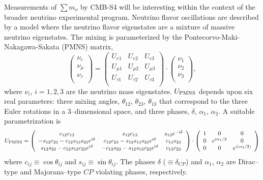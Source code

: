 Measurements of $ \sum m_\nu $ by CMB-S4 will be interesting within the context of the broader neutrino experimental program. Neutrino flavor oscillations are described by a model where the neutrino flavor eigenstates are a mixture of massive neutrino eigenstates. The mixing is parameterized by the Pontecorvo-Maki-Nakagawa-Sakata (PMNS) matrix,
\[ \left( \begin{array}{c} \nu_e \\ \nu_{\mu} \\ \nu_{\tau} \\ \end{array} \right) = 
\left( \begin{array}{ccc} U_{e1} & U_{e2} & U_{e3} \\ U_{\mu1} & U_{\mu2} & U_{\mu3} \\ U_{\tau1} & U_{\tau2} & U_{\tau3} \\
\end{array} \right) \cdot
\left( \begin{array}{c} \nu_1 \\ \nu_2 \\ \nu_3 \\ \end{array} \right),
\]
where $\nu_{i}$, $i=1,2,3$ are the neutrino mass eigenstates. $U_{\rm PMNS}$ depends upon six real parameters: three mixing angles, $\theta_{12}$,  $\theta_{23}$, $\theta_{13}$ that
correspond to the three Euler rotations in a 3--dimensional space, and three phases, $\delta$, $\alpha_1$, $\alpha_2$. A suitable parametrization is
\[ U_{\rm PMNS}=
\left( \begin{array}{ccc} c_{12}c_{13} & s_{12}c_{13} & s_{13} e^{-i\delta} \\ 
-s_{12}c_{23} - c_{12}s_{13}s_{23} e^{i\delta} & c_{12}c_{23} - s_{12}s_{13}s_{23} e^{i\delta} & c_{13}s_{23} \\
s_{12}s_{23} - c_{12}s_{13}c_{23} e^{i\delta} & -c_{12}s_{23} - s_{12}s_{13}c_{23} e^{i\delta} & c_{13}c_{23} \\
\end{array} \right) \cdot
\left( \begin{array}{ccc} 1 & 0 & 0 \\ 0 & e^{i\alpha_1/2} & 0 \\ 0 & 0 & e^{i(\alpha_2/2)} \\ 
\end{array} \right)
\]
where $c_{ij} \equiv \cos\theta_{ij}$ and $s_{ij} \equiv \sin\theta_{ij}$. 
The phases $\delta$ ($\equiv \delta_{CP}$) and $\alpha_1$, $\alpha_2$ are Dirac--type and Majorana--type $CP$ violating phases, respectively.

